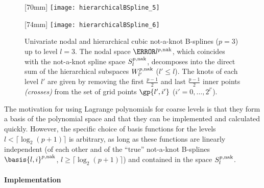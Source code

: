 \begin{figure}
  [70mm]{%
    \texttt{[image: hierarchicalBSpline\_5]}%
  }%
  \hfill%
  \hfill%
  [74mm]{%
    \texttt{[image: hierarchicalBSpline\_6]}%
  }%
  \caption{%
    Univariate nodal and hierarchical cubic not-a-knot B-splines ($p = 3$)
    up to level $l = 3$.
    The nodal space $\ns{l}^{p,\notaknot}$,
    which coincides with the not-a-knot spline space $S_l^{p,\mathrm{nak}}$,
    decomposes into the direct sum
    of the hierarchical subspaces $W_{l'}^{p,\mathrm{nak}}$ ($l' \le l$).
    The knots of each level $l'$ are given by removing the
    first $\tfrac{p-1}{2}$ and last $\tfrac{p-1}{2}$
    inner points \emph{(crosses)}
    from the set of grid points $\gp{l',i'}$
    ($i' = 0, \dotsc, 2^{l'}$).%
  }%
  \label{fig:notAKnotBSpline}%
\end{figure}

The motivation for using Lagrange polynomials for coarse levels
is that they form a basis of the polynomial space
and that they can be implemented and calculated quickly.
However, the specific choice of basis functions for the levels
$l < \lceil\log_2(p + 1)\rceil$ is arbitrary,
as long as these functions are linearly independent
(of each other and of the ``true'' not-a-knot B-splines
$\basis{l,i}^{p,\notaknot}$, $l \ge \lceil\log_2(p+1)\rceil$)
and contained in the space $S_l^{p,\mathrm{nak}}$.

\paragraph{Implementation}

